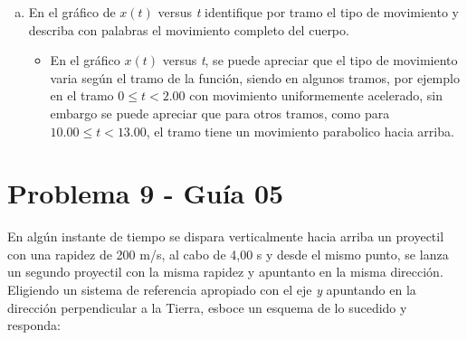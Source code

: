 \documentclass[12pt,tikz,border=3.14mm]{article}
\begin{document}
\begin{enumerate}[a), leftmargin=1cm]
\begin{center}
			\end{center}
	\newpage
			\item En el gráfico de $x(t)$ versus \emph{t} identifique por tramo el tipo de movimiento y describa con palabras el movimiento completo del cuerpo.
			 	\begin{itemize}
			 		\item En el gráfico $x(t)$ versus \emph{t}, se puede apreciar que el tipo de movimiento varia según el tramo de la función, siendo en algunos tramos, por ejemplo en el tramo $0 \leq t < 2.00$ con movimiento uniformemente acelerado, sin embargo se puede apreciar que para otros tramos, como para $10.00 \leq t <13.00$, el tramo tiene un movimiento parabolico hacia arriba.
			 	\end{itemize}
		\end{enumerate}
\section{Problema 9 - Guía 05}
	En algún instante de tiempo se dispara verticalmente hacia arriba un proyectil con una rapidez de 200 m/s, al cabo de 4,00 s y desde el mismo punto, se lanza un segundo proyectil con la misma rapidez y apuntanto en la misma dirección. Eligiendo un sistema de referencia apropiado con el eje \emph{y} apuntando en la dirección perpendicular a la Tierra, esboce un esquema de lo sucedido y responda: 
\end{document}
